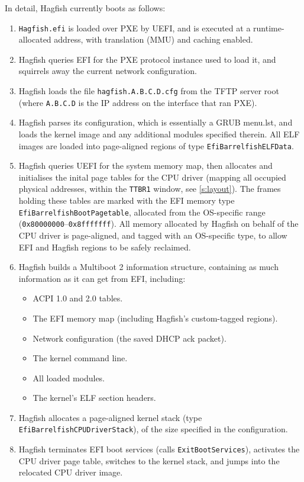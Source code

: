 \documentclass[a4paper,twoside]{report}
\begin{document}
In detail, Hagfish currently boots as follows:

\begin{enumerate}
\item \texttt{Hagfish.efi} is loaded over PXE by UEFI, and is executed at a
runtime-allocated address, with translation (MMU) and caching enabled.
\item Hagfish queries EFI for the PXE protocol instance used to load it, and
squirrels away the current network configuration.
\item Hagfish loads the file \texttt{hagfish.A.B.C.D.cfg} from the TFTP server
root (where \texttt{A.B.C.D} is the IP address on the interface that ran PXE).
\item Hagfish parses its configuration, which is essentially a GRUB menu.lst,
and loads the kernel image and any additional modules specified therein. All
ELF images are loaded into page-aligned regions of type
\texttt{EfiBarrelfishELFData}.
\item Hagfish queries UEFI for the system memory map, then allocates and
initialises the inital page tables for the CPU driver (mapping all occupied
physical addresses, within the \texttt{TTBR1} window, see \autoref{s:layout}).
The frames holding these tables are marked with the EFI memory type\\
\texttt{EfiBarrelfishBootPagetable}, allocated from the OS-specific range
(\texttt{0x80000000}--\texttt{0x8fffffff}). All memory allocated by Hagfish on
behalf of the CPU driver is page-aligned, and tagged with an OS-specific type,
to allow EFI and Hagfish regions to be safely reclaimed.
\item Hagfish builds a Multiboot 2 information structure, containing as much
information as it can get from EFI, including:
    \begin{itemize}
    \item ACPI 1.0 and 2.0 tables.
    \item The EFI memory map (including Hagfish's custom-tagged regions).
    \item Network configuration (the saved DHCP ack packet).
    \item The kernel command line.
    \item All loaded modules.
    \item The kernel's ELF section headers.
    \end{itemize}
\item Hagfish allocates a page-aligned kernel stack (type
\texttt{EfiBarrelfishCPUDriverStack}), of the size specified in the
configuration.
\item Hagfish terminates EFI boot services (calls \texttt{ExitBootServices}),
activates the CPU driver page table, switches to the kernel stack, and jumps
into the relocated CPU driver image.
\end{enumerate}
\end{document}
